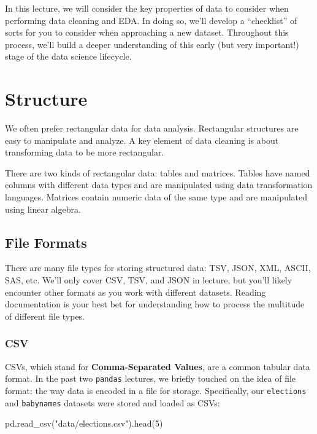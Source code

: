 \documentclass[
  letterpaper,
  DIV=11,
  numbers=noendperiod]{scrreprt}
\newenvironment{Shaded}{\begin{snugshade}}{\end{snugshade}}
\newcommand{\DecValTok}[1]{\textcolor[rgb]{0.68,0.00,0.00}{#1}}
\newcommand{\NormalTok}[1]{\textcolor[rgb]{0.00,0.23,0.31}{#1}}
\newcommand{\StringTok}[1]{\textcolor[rgb]{0.13,0.47,0.30}{#1}}
\begin{document}
In this lecture, we will consider the key properties of data to consider
when performing data cleaning and EDA. In doing so, we'll develop a
``checklist'' of sorts for you to consider when approaching a new
dataset. Throughout this process, we'll build a deeper understanding of
this early (but very important!) stage of the data science lifecycle.

\section{Structure}\label{structure}

We often prefer rectangular data for data analysis. Rectangular
structures are easy to manipulate and analyze. A key element of data
cleaning is about transforming data to be more rectangular.

There are two kinds of rectangular data: tables and matrices. Tables
have named columns with different data types and are manipulated using
data transformation languages. Matrices contain numeric data of the same
type and are manipulated using linear algebra.

\subsection{File Formats}\label{file-formats}

There are many file types for storing structured data: TSV, JSON, XML,
ASCII, SAS, etc. We'll only cover CSV, TSV, and JSON in lecture, but
you'll likely encounter other formats as you work with different
datasets. Reading documentation is your best bet for understanding how
to process the multitude of different file types.

\subsubsection{CSV}\label{csv}

CSVs, which stand for \textbf{Comma-Separated Values}, are a common
tabular data format. In the past two \texttt{pandas} lectures, we
briefly touched on the idea of file format: the way data is encoded in a
file for storage. Specifically, our \texttt{elections} and
\texttt{babynames} datasets were stored and loaded as CSVs:

\begin{Shaded}
\begin{Highlighting}[]
\NormalTok{pd.read\_csv(}\StringTok{"data/elections.csv"}\NormalTok{).head(}\DecValTok{5}\NormalTok{)}
\end{Highlighting}
\end{Shaded}
\end{document}

